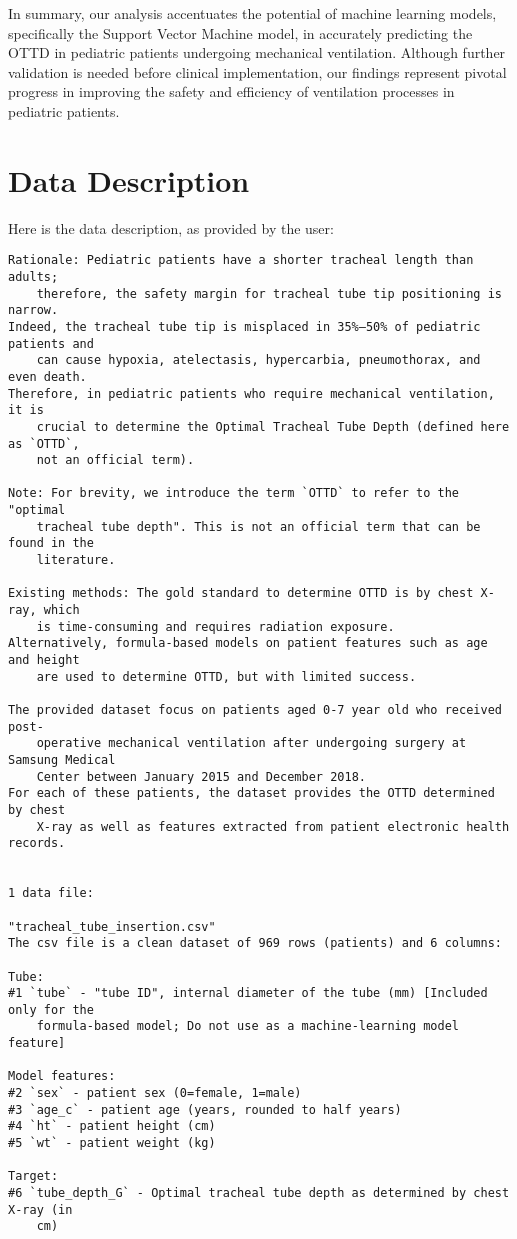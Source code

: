 \documentclass[11pt]{article}
\begin{document}
In summary, our analysis accentuates the potential of machine learning models, specifically the Support Vector Machine model, in accurately predicting the OTTD in pediatric patients undergoing mechanical ventilation. Although further validation is needed before clinical implementation, our findings represent pivotal progress in improving the safety and efficiency of ventilation processes in pediatric patients.


\clearpage
\appendix

\section{Data Description} \label{sec:data_description} Here is the data description, as provided by the user:

\begin{Verbatim}[tabsize=4]
Rationale: Pediatric patients have a shorter tracheal length than adults;
	therefore, the safety margin for tracheal tube tip positioning is narrow.
Indeed, the tracheal tube tip is misplaced in 35%–50% of pediatric patients and
	can cause hypoxia, atelectasis, hypercarbia, pneumothorax, and even death.
Therefore, in pediatric patients who require mechanical ventilation, it is
	crucial to determine the Optimal Tracheal Tube Depth (defined here as `OTTD`,
	not an official term).

Note: For brevity, we introduce the term `OTTD` to refer to the "optimal
	tracheal tube depth". This is not an official term that can be found in the
	literature.

Existing methods: The gold standard to determine OTTD is by chest X-ray, which
	is time-consuming and requires radiation exposure.
Alternatively, formula-based models on patient features such as age and height
	are used to determine OTTD, but with limited success.

The provided dataset focus on patients aged 0-7 year old who received post-
	operative mechanical ventilation after undergoing surgery at Samsung Medical
	Center between January 2015 and December 2018.
For each of these patients, the dataset provides the OTTD determined by chest
	X-ray as well as features extracted from patient electronic health records.


1 data file:

"tracheal_tube_insertion.csv"
The csv file is a clean dataset of 969 rows (patients) and 6 columns:

Tube:
#1 `tube` - "tube ID", internal diameter of the tube (mm) [Included only for the
	formula-based model; Do not use as a machine-learning model feature]

Model features:
#2 `sex` - patient sex (0=female, 1=male)
#3 `age_c` - patient age (years, rounded to half years)
#4 `ht` - patient height (cm)
#5 `wt` - patient weight (kg)

Target:
#6 `tube_depth_G` - Optimal tracheal tube depth as determined by chest X-ray (in
	cm)



\end{Verbatim}
\end{document}
